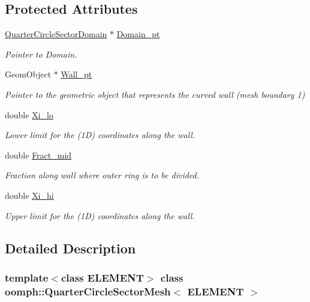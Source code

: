 \subsection*{Protected Attributes}
\begin{DoxyCompactItemize}
\item 
\hyperlink{classoomph_1_1QuarterCircleSectorDomain}{Quarter\+Circle\+Sector\+Domain} $\ast$ \hyperlink{classoomph_1_1QuarterCircleSectorMesh_a49e72c17a9409ec4a2b7a1ebf98fb4a1}{Domain\+\_\+pt}
\begin{DoxyCompactList}\small\item\em Pointer to Domain. \end{DoxyCompactList}\item 
Geom\+Object $\ast$ \hyperlink{classoomph_1_1QuarterCircleSectorMesh_a2cbdec5f0ee2f370c38f1fdc4e2904f8}{Wall\+\_\+pt}
\begin{DoxyCompactList}\small\item\em Pointer to the geometric object that represents the curved wall (mesh boundary 1) \end{DoxyCompactList}\item 
double \hyperlink{classoomph_1_1QuarterCircleSectorMesh_ab5c1e4484c69eb78bd3323321605a93c}{Xi\+\_\+lo}
\begin{DoxyCompactList}\small\item\em Lower limit for the (1D) coordinates along the wall. \end{DoxyCompactList}\item 
double \hyperlink{classoomph_1_1QuarterCircleSectorMesh_a149224b002f785eb357553f8210ad5d3}{Fract\+\_\+mid}
\begin{DoxyCompactList}\small\item\em Fraction along wall where outer ring is to be divided. \end{DoxyCompactList}\item 
double \hyperlink{classoomph_1_1QuarterCircleSectorMesh_a1fa3bfeddd4467e9fe0ec45fbfac0740}{Xi\+\_\+hi}
\begin{DoxyCompactList}\small\item\em Upper limit for the (1D) coordinates along the wall. \end{DoxyCompactList}\end{DoxyCompactItemize}


\subsection{Detailed Description}
\subsubsection*{template$<$class E\+L\+E\+M\+E\+NT$>$\newline
class oomph\+::\+Quarter\+Circle\+Sector\+Mesh$<$ E\+L\+E\+M\+E\+N\+T $>$}

